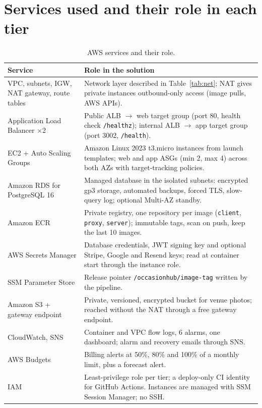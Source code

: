 \documentclass[10pt,a4paper]{article}
\begin{document}
\section{Services used and their role in each tier}
\begin{table}[H]\centering\small
\caption{AWS services and their role.}\label{tab:services}
\begin{tabularx}{\linewidth}{@{}l L@{}}
\toprule
Service & Role in the solution \\
\midrule
VPC, subnets, IGW, NAT gateway, route tables & Network layer described in Table~\ref{tab:net}; NAT gives private instances outbound-only access (image pulls, AWS APIs). \\
Application Load Balancer $\times$2 & Public ALB $\rightarrow$ web target group (port 80, health check \texttt{/healthz}); internal ALB $\rightarrow$ app target group (port 3002, \texttt{/health}). \\
EC2 + Auto Scaling Groups & Amazon Linux 2023 t3.micro instances from launch templates; web and app ASGs (min 2, max 4) across both AZs with target-tracking policies. \\
Amazon RDS for PostgreSQL 16 & Managed database in the isolated subnets: encrypted gp3 storage, automated backups, forced TLS, slow-query log; optional Multi-AZ standby. \\
Amazon ECR & Private registry, one repository per image (\texttt{client}, \texttt{proxy}, \texttt{server}); immutable tags, scan on push, keep the last 10 images. \\
AWS Secrets Manager & Database credentials, JWT signing key and optional Stripe, Google and Resend keys; read at container start through the instance role. \\
SSM Parameter Store & Release pointer \texttt{/occasionhub/image-tag} written by the pipeline. \\
Amazon S3 + gateway endpoint & Private, versioned, encrypted bucket for venue photos; reached without the NAT through a free gateway endpoint. \\
CloudWatch, SNS & Container and VPC flow logs, 6 alarms, one dashboard; alarm and recovery emails through SNS. \\
AWS Budgets & Billing alerts at 50\%, 80\% and 100\% of a monthly limit, plus a forecast alert. \\
IAM & Least-privilege role per tier; a deploy-only CI identity for GitHub Actions. Instances are managed with SSM Session Manager; no SSH. \\
\bottomrule
\end{tabularx}
\end{table}
\end{document}
